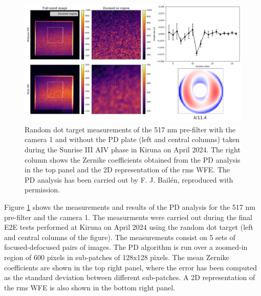 \begin{figure}[t]
    \includegraphics[width=\textwidth]{figures/TuMag/PD_e2e.pdf}
    \caption{Random dot target measurements of the 517 nm pre-filter with the camera 1 and without the PD plate (left and central columns) taken during the Sunrise III AIV phase in Kiruna on April 2024. The right column shows the Zernike coefficients obtained from the PD analysis in the top panel and the 2D representation of the rms WFE. The PD analysis has been carried out by F. J. Bailén, reproduced with permission.}
      \label{tumag : PD}
\end{figure}

Figure \ref{tumag : PD} shows the measurements and results of the PD analysis for the 517 nm pre-filter and the camera 1. The measurments were carried out during the final E2E tests performed at Kiruna on April 2024 using the random dot target (left and central columns of the figure). The measurements consist on 5 sets of focused-defocused pairs of images. The PD algorithm is run over a zoomed-in region of 600 pixels in sub-patches of 128x128 pixels. The mean Zernike coefficients are shown in the top right panel, where the error has been computed as the standard deviation between different sub-patches. A 2D representation of the rms WFE is also shown in the bottom right panel. 

